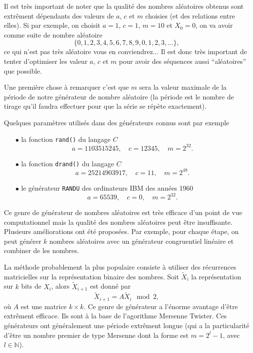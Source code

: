 \documentclass[a4paper,12pt]{book}
\renewcommand{\natural}{\mathbb{N}}
\begin{document}
Il est très important de noter que la qualité des nombres aléatoires obtenus
sont extrêment dépendants des valeurs de $a$, $c$ et $m$ choisies (et des 
relations entre elles). Si par exemple, on choisit 
$a=1$, $c=1$, $m=10$ et $X_0=0$, on va avoir comme suite de nombre aléatoire
\begin{equation}
 \{0,1,2,3,4,5,6,7,8,9,0,1,2,3,...\},
\end{equation}
ce qui n'est pas très aléatoire vous en conviendrez... Il est donc très important
de tenter d'optimiser les valeur $a$, $c$ et $m$ pour
avoir des séquences aussi ``aléatoires'' que possible.

Une première chose à remarquer c'est que $m$ sera la valeur maximale de la période
de notre générateur de nombre aléatoire (la période est le nombre de tirage qu'il faudra
effectuer pour que la série se répète exactement).

Quelques paramètres utilisés dans des générateurs connus sont par exemple
\begin{itemize}
 \item[$\bullet$] la fonction \texttt{rand()} du langage $C$ 
 \begin{equation*}
  a=1103515245,\quad c=12345,\quad m=2^{32}.
 \end{equation*}
 \item[$\bullet$] la fonction \texttt{drand()} du langage $C$ 
 \begin{equation*}
  a=25214903917,\quad c=11,\quad m=2^{48}.
 \end{equation*}
 \item[$\bullet$] le générateur \texttt{RANDU} des ordinateurs IBM des années 1960
 \begin{equation*}
  a=65539,\quad c=0,\quad m=2^{32}.
 \end{equation*}
\end{itemize}

Ce genre de générateur de nombres aléatoires est très efficace d'un point de vue computationnel
mais la qualité des nombres aléatoires peut être insuffisante. Plusieurs améliorations
ont été proposées. Par exemple, pour chaque étape, on peut générer $k$ nombres aléatoires
avec un générateur congruentiel linéaire et combiner de les nombres.

La méthode probablement la plus populaire consiste à utiliser 
des récurrences matricielles sur la représentation binaire des nombres.
Soit $\tilde X_i$ la représentation sur $k$ bits de $X_i$, alors 
$\tilde X_{i+1}$ est donné par
\begin{equation}
 \tilde X_{i+1}=A \tilde X_i \mod 2,
\end{equation}
où $A$ est une matrice $k\times k$. Ce genre de générateur a l'énorme
avantage d'être extrêment efficace. Ils sont à la base de l'agorithme Mersenne Twister.
Ces générateurs ont généralement une période extrêment longue (qui a la particularité d'être
un nombre premier de type Mersenne dont la forme est $m=2^l-1$, avec $l\in\natural$).
\end{document}
